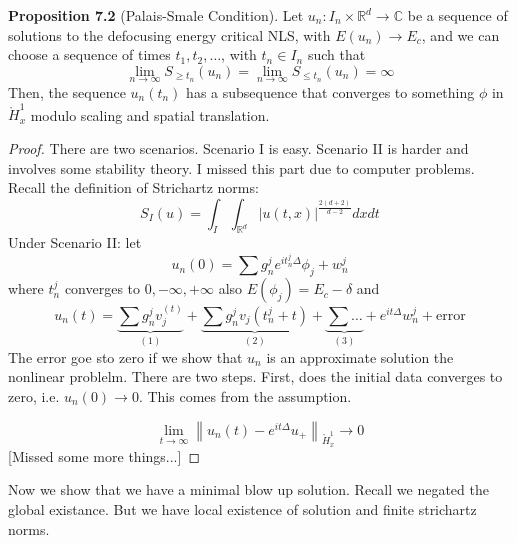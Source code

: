 \documentclass{article}
\def\purple{\color{Purple}}
\newcommand{\pnote}[1]{{\purple [#1]}} %
\def\R{\mathbb{R}} %
\newcommand\norm[1]{\left\lVert#1\right\rVert}
\begin{document}
\textbf{Proposition 7.2} (Palais-Smale Condition). Let $u_{n}:I_{n}\times \R^d
\to \mathbb{C}$  be a sequence of solutions to the defocusing energy critical
NLS, with $E(u_{n}) \to E_{c}$,  and we can choose a sequence of times
$t_{1},t_{2},\ldots$, with $t_{n} \in I_{n}$ such that
\begin{equation*}
  \lim_{n\to\infty} S_{ \geq t_{n}}(u_{n}) = \lim_{n\to\infty} S_{ \leq t_{n}}(u_{n}) = \infty
\end{equation*}
Then, the sequence $u_{n}(t_{n})$ has a subsequence that converges to something
$\phi$ in $\mathring{H}_{x}^{1}$ modulo scaling and spatial translation.
\begin{proof}
  There are two scenarios. Scenario I is easy. Scenario II is harder and
  involves some stability theory. I missed this part due to computer problems.
  Recall the definition of Strichartz norms:
  \begin{equation*}
    S_{I}(u) 
    = \int_{I} \int_{\R^d} \left| u(t,x) \right|^{\frac{2(d+2)}{d-2}}dxdt   
  \end{equation*}
  Under Scenario II:  let
  \begin{equation*}
    u_{n}(0) 
    = \sum g_{n}^{j} e^{it_{n}^{j}\Delta}\phi_{j}+w_{n}^{j}
  \end{equation*}
  where $t_{n}^{j}$ converges to $0, -\infty,+\infty $
  also
  $E(\phi_{j})= E_{c}-\delta$
  and
  \begin{equation*}
    u_{n}(t) 
    = \underbrace{\sum g_{n}^{j}v_{j}^{(t)}}_{(1)}+ \underbrace{\sum g_{n}^{j}v_{j}(t_{n}^{j}+t)}_{(2)}+ \underbrace{\sum \ldots }_{(3)} + e^{it\Delta}w_{n}^{j} + \text{error}
  \end{equation*}
  The error goe sto zero if we show that $u_{n}$ is an approximate solution the
  nonlinear problelm.  There are two steps. First, does the initial data
  converges to zero, i.e.  $u_{n}(0)\to 0$. This comes from the assumption.

  \begin{equation*}
    \lim_{t \to \infty }  \norm{u_{n}(t)
      - e^{it\Delta}u_{+}}_{\mathring{H}_{x}^{1}}\to 0
  \end{equation*}
  \pnote{Missed some more things...}

\end{proof}

Now we show that we have a minimal blow up solution. Recall we negated the
global existance. But we have local existence of solution and finite
strichartz norms.
\end{document}
